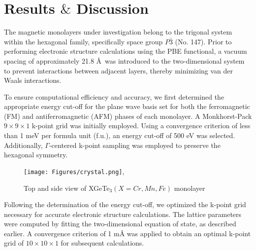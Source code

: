 

\chapter{\texorpdfstring{Results $\&$ Discussion}{Results \& Discussion}}  %
The magnetic monolayers under investigation belong to the trigonal system within the hexagonal family, specifically space group $P\bar{3}$ (No. 147). Prior to performing electronic structure calculations using the PBE functional, a vacuum spacing of approximately 21.8 \AA \ was introduced to the two-dimensional system to prevent interactions between adjacent layers, thereby minimizing van der Waals interactions.

To ensure computational efficiency and accuracy, we first determined the appropriate energy cut-off for the plane wave basis set for both the ferromagnetic (FM) and antiferromagnetic (AFM) phases of each monolayer. A Monkhorst-Pack $9 \times 9 \times 1$ k-point grid was initially employed. Using a convergence criterion of less than 1 meV per formula unit (f.u.), an energy cut-off of 500 eV was selected. Additionally, $\Gamma$-centered k-point sampling was employed to preserve the hexagonal symmetry.
\begin{figure}[H]
	\centering
	\texttt{[image: Figures/crystal.png]},
	\caption{Top and side view of XGeTe$_{3} (X=Cr, Mn, Fe)$ monolayer}
	\label{fig:4.1}
\end{figure}

Following the determination of the energy cut-off, we optimized the k-point grid necessary for accurate electronic structure calculations. The lattice parameters were computed by fitting the two-dimensional equation of state, as described earlier. A convergence criterion of 1 mÅ was applied to obtain an optimal k-point grid of $10 \times 10 \times 1$ for subsequent calculations.

\label{Chapter4} %


